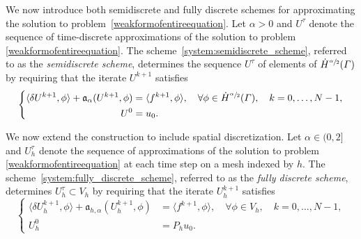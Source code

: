 \documentclass[numbers,webpdf]{ima-authoring-template}%
\theoremstyle{thmstyletwo}%
\numberwithin{equation}{section}
\begin{document}
We now introduce both semidiscrete and fully discrete schemes for approximating the solution to problem~\eqref{weakformofentireequation}.
%
Let $\alpha>0$ and $U^\tau$ denote the sequence of time-discrete approximations of the solution to problem \eqref{weakformofentireequation}. The scheme~\eqref{system:semidiscrete_scheme}, referred to as the \emph{semidiscrete scheme}, determines the sequence $U^\tau$ of elements of $\dot{H}^{\sfrac{\alpha}{2}}({\mit\varGamma})$ by requiring that the iterate $U^{k+1}$ satisfies
\begin{equation}
\label{system:semidiscrete_scheme}
    \left\{
\begin{aligned}
    \langle\delta U^{k+1},\phi\rangle + \mathfrak{a}_{\alpha}(U^{k+1},\phi)  &= \langle f^{k+1},\phi\rangle , \quad\forall\phi\in \dot{H}^{\sfrac{\alpha}{2}}({\mit\varGamma}),\quad k=0,\dots, N-1, \\
    U^0 &= u_0.
\end{aligned}
\right.
\end{equation}

We now extend the construction to include spatial discretization. Let $\alpha\in(0,2]$ and $U_h^\tau$ denote the sequence of approximations of the solution to problem \eqref{weakformofentireequation} at each time step on a mesh indexed by $h$. The scheme~\eqref{system:fully_discrete_scheme}, referred to as the \emph{fully discrete scheme}, determines $U_h^{\tau}\subset V_h$ by requiring that the iterate $U^{k+1}_h$ satisfies
\begin{equation}
\label{system:fully_discrete_scheme}
    \left\{
\begin{aligned}
    \langle\delta U_h^{k+1},\phi\rangle + \mathfrak{a}_{h,\alpha}(
        U_h^{k+1},\phi) &= \langle f^{k+1},\phi\rangle, \quad\forall\phi\in V_h,\quad k=0,\dots, N-1, \\
    U^0_h &= P_hu_0.
\end{aligned}
\right.
\end{equation}
\end{document}
